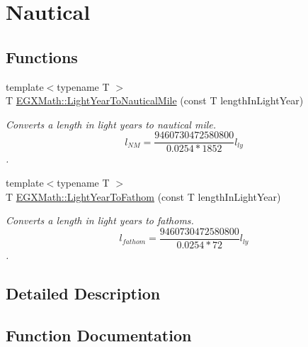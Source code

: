 \hypertarget{group___e_g_x_math-_conversions-_length_conversions-_astronomical-_light_year-_nautical}{}\section{Nautical}
\label{group___e_g_x_math-_conversions-_length_conversions-_astronomical-_light_year-_nautical}
\subsection*{Functions}
\begin{DoxyCompactItemize}
\item 
{\footnotesize template$<$typename T $>$ }\\T \mbox{\hyperlink{group___e_g_x_math-_conversions-_length_conversions-_astronomical-_light_year-_nautical_ga0195b6c7d9efe06bed6d571046d485b4}{E\+G\+X\+Math\+::\+Light\+Year\+To\+Nautical\+Mile}} (const T length\+In\+Light\+Year)
\begin{DoxyCompactList}\small\item\em Converts a length in light years to nautical mile. \[ l_{NM}= \frac{9460730472580800}{0.0254 * 1852} l_{ly} \]. \end{DoxyCompactList}\item 
{\footnotesize template$<$typename T $>$ }\\T \mbox{\hyperlink{group___e_g_x_math-_conversions-_length_conversions-_astronomical-_light_year-_nautical_gad53c415df3fcb65654ccf0d1cd79ef4a}{E\+G\+X\+Math\+::\+Light\+Year\+To\+Fathom}} (const T length\+In\+Light\+Year)
\begin{DoxyCompactList}\small\item\em Converts a length in light years to fathoms. \[ l_{fathom}= \frac{9460730472580800}{0.0254 * 72} l_{ly} \]. \end{DoxyCompactList}\end{DoxyCompactItemize}


\subsection{Detailed Description}


\subsection{Function Documentation}
\mbox{\label{group___e_g_x_math-_conversions-_length_conversions-_astronomical-_light_year-_nautical_gad53c415df3fcb65654ccf0d1cd79ef4a}} 
